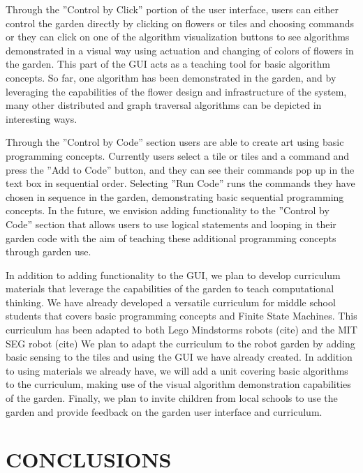 \documentclass[letterpaper, 10 pt, conference]{ieeeconf}  %
\begin{document}
Through the ''Control by Click'' portion of the user interface, users can either control the garden directly by clicking on flowers or tiles and choosing commands or they can click on one of the algorithm visualization buttons to see algorithms demonstrated in a visual way using actuation and changing of colors of flowers in the garden.  This part of the GUI acts as a teaching tool for basic algorithm concepts.  So far, one algorithm has been demonstrated in the garden, and by leveraging the capabilities of the flower design and infrastructure of the system, many other distributed and graph traversal algorithms can be depicted in interesting ways.  

Through the ''Control by Code'' section users are able to create art using basic programming concepts.  Currently users select a tile or tiles and a command and press the ''Add to Code'' button, and they can see their commands pop up in the text box in sequential order.  Selecting ''Run Code'' runs the commands they have chosen in sequence in the garden, demonstrating basic sequential programming concepts.  In the future, we envision adding functionality to the ''Control by Code'' section that allows users to use logical statements and looping in their garden code with the aim of teaching these additional programming concepts through garden use.

In addition to adding functionality to the GUI, we plan to develop curriculum materials that leverage the capabilities of the garden to teach computational thinking.  We have already developed a versatile curriculum for middle school students that covers basic programming concepts and Finite State Machines.  This curriculum has been adapted to both Lego Mindstorms robots (cite) and the MIT SEG robot (cite) We plan to adapt the curriculum to the robot garden by adding basic sensing to the tiles and using the GUI we have already created.  In addition to using materials we already have, we will add a unit covering basic algorithms to the curriculum, making use of the visual algorithm demonstration capabilities of the garden.  Finally, we plan to invite children from local schools to use the garden and provide feedback on the garden user interface and curriculum.

\section{CONCLUSIONS}
\end{document}
